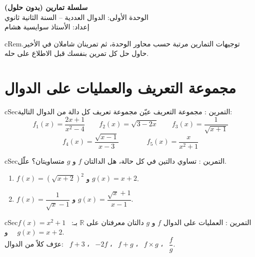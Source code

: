\documentclass[12pt,a4paper]{article}
\newenvironment{BOX}[2]{\begin{otherlanguage}{english}\begin{arbox}{#1}{#2}}{\end{arbox}\end{otherlanguage}}
\newenvironment{molahada}[1][ملاحظة]{\begin{BOX}{cRem}{#1}}{\end{BOX}}
\newcounter{exo}
\newenvironment{tamrin}[1]{\stepcounter{exo}\begin{BOX}{cSec}{التمرين \theexo: #1}}{\end{BOX}}
\newenvironment{LTR}{\begin{otherlanguage}{english}}{\end{otherlanguage}}
\newcommand{\R}{\mathbb{R}}
\begin{document}
\begin{LTR}
\begin{tcolorbox}[enhanced,colback=cSec,colframe=cSec,arc=3mm,halign=center,
  boxrule=0pt,top=10pt,bottom=10pt,before upper={\selectlanguage{arabic}}]
{\color{white}\Huge\bfseries سلسلة تمارين (بدون حلول)}\\[6pt]
{\color{white}\large الوحدة الأولى: الدوال العددية -- السنة الثانية ثانوي}\\[4pt]
{\color{white!85!cSec}\normalsize إعداد: الأستاذ سوايسية هشام}
\end{tcolorbox}
\end{LTR}

\begin{molahada}[توجيهات]
التمارين مرتبة حسب محاور الوحدة، ثم تمرينان شاملان في الأخير. حاول حل كل تمرين بنفسك قبل الاطلاع على حله.
\end{molahada}

\section{مجموعة التعريف والعمليات على الدوال}
\begin{tamrin}{مجموعة التعريف}
عيّن مجموعة تعريف كل دالة من الدوال التالية:
\[f_1(x)=\frac{2x+1}{x^2-4}\qquad f_2(x)=\sqrt{3-2x}\qquad f_3(x)=\frac{1}{\sqrt{x+1}}\]
\[f_4(x)=\frac{\sqrt{x-1}}{x-3}\qquad\qquad f_5(x)=\frac{x}{x^2+1}\]
\end{tamrin}

\begin{tamrin}{تساوي دالتين}
في كل حالة، هل الدالتان $f$ و $g$ متساويتان؟ علّل.
\begin{enumerate}
\item $f(x)=\left(\sqrt{x+2}\right)^2$ \quad و \quad $g(x)=x+2$.
\item $f(x)=\dfrac{1}{\sqrt x-1}$ \quad و \quad $g(x)=\dfrac{\sqrt x+1}{x-1}$.
\end{enumerate}
\end{tamrin}

\begin{tamrin}{العمليات على الدوال}
$f$ و $g$ دالتان معرفتان على $\R$ بـ: \ $f(x)=x^2+1$ \ و \ $g(x)=x+2$.\\
عرّف كلاً من الدوال: \ $f+3$ ، \ $-2f$ ، \ $f+g$ ، \ $f\times g$ ، \ $\dfrac fg$.
\end{tamrin}

\end{document}

